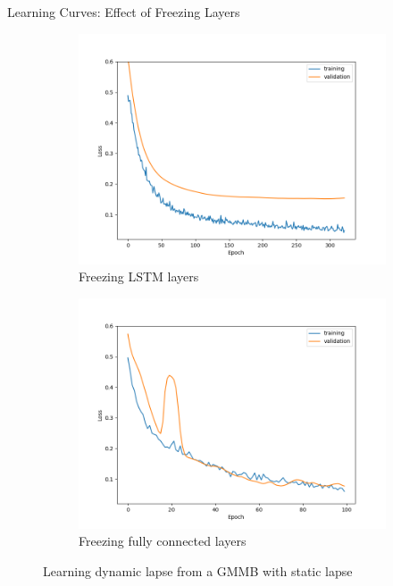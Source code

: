 \documentclass[9pt,handout]{beamer}
\begin{document}
    
\begin{frame}{Learning Curves: Effect of Freezing Layers}
    \begin{figure}[ht]
        \centering
        \begin{subfigure}{0.48\textwidth}
            \includegraphics[width=\textwidth]{../project3/figures/figure3a.png}
            \caption{Freezing LSTM layers}
        \end{subfigure}
        \begin{subfigure}{0.48\textwidth}
            \includegraphics[width=\textwidth]{../project3/figures/figure3b.png}
            \caption{Freezing fully connected layers}
        \end{subfigure}
        \caption{Learning dynamic lapse from a GMMB with static lapse}
    \end{figure}


\end{frame}
\end{document}
